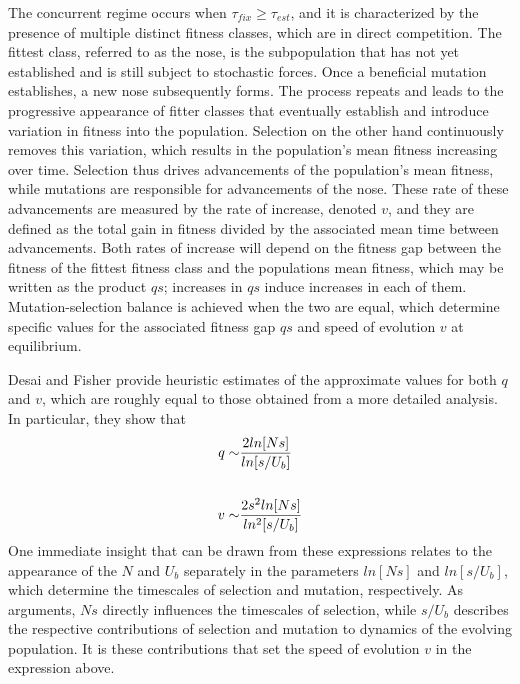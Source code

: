 \documentclass[12pt, one column]{article}
\begin{document}
The concurrent regime occurs when $\tau_{fix} \ge \tau_{est}$, and it is characterized by the presence of multiple distinct fitness classes, which are in direct competition.  The fittest class, referred to as the nose, is the subpopulation that has not yet established and is still subject to stochastic forces.  Once a beneficial mutation establishes, a new nose subsequently forms.  The process repeats and leads to the progressive appearance of fitter classes that eventually establish and introduce variation in fitness into the population.  Selection on the other hand continuously removes this variation, which results in the population's mean fitness increasing over time.  Selection thus drives advancements of the population's mean fitness, while mutations are responsible for advancements of the nose.  These rate of these advancements are measured by the rate of increase, denoted $v$, and they are defined as the total gain in fitness divided by the associated mean time between advancements.  Both rates of increase will depend on the fitness gap between the fitness of the fittest fitness class and the populations mean fitness, which may be written as the product $qs$; increases in $qs$ induce increases in each of them.  Mutation-selection balance is achieved when the two are equal, which determine specific values for the associated fitness gap $qs$ and speed of evolution $v$ at equilibrium. 

Desai and Fisher provide heuristic estimates of the approximate values for both $q$ and $v$, which are roughly equal to those obtained from a more detailed analysis.  In particular, they show that
\begin{equation}
\begin{aligned}
q \sim & {2ln[Ns] \over ln[s/U_b]} \\   
\\
v \sim & {2s^2ln[Ns] \over ln^2[s/U_b]}
\end{aligned}
\end{equation}
One immediate insight that can be drawn from these expressions relates to the appearance of the $N$ and $U_b$ separately in the parameters $ln[Ns]$ and $ln[s/U_b]$, which determine the timescales of selection and mutation, respectively.  As arguments, $Ns$ directly influences the timescales of selection, while $s/U_b$ describes the respective contributions of selection and mutation to dynamics of the evolving population.  It is these contributions that set the speed of evolution $v$ in the expression above.   
\end{document}
